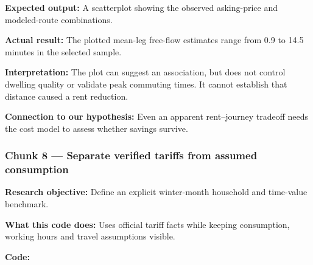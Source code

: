 \documentclass[
]{article}
\newenvironment{Shaded}{\begin{snugshade}}{\end{snugshade}}
\newcommand{\AttributeTok}[1]{\textcolor[rgb]{0.13,0.29,0.53}{#1}}
\newcommand{\DecValTok}[1]{\textcolor[rgb]{0.00,0.00,0.81}{#1}}
\newcommand{\FloatTok}[1]{\textcolor[rgb]{0.00,0.00,0.81}{#1}}
\newcommand{\FunctionTok}[1]{\textcolor[rgb]{0.13,0.29,0.53}{\textbf{#1}}}
\newcommand{\NormalTok}[1]{#1}
\newcommand{\OtherTok}[1]{\textcolor[rgb]{0.56,0.35,0.01}{#1}}
\newcommand{\SpecialCharTok}[1]{\textcolor[rgb]{0.81,0.36,0.00}{\textbf{#1}}}
\newcommand{\StringTok}[1]{\textcolor[rgb]{0.31,0.60,0.02}{#1}}
\begin{document}
\begin{Shaded}
\end{Shaded}

\textbf{Expected output:} A scatterplot showing the observed
asking-price and modeled-route combinations.

\textbf{Actual result:} The plotted mean-leg free-flow estimates range
from 0.9 to 14.5 minutes in the selected sample.

\textbf{Interpretation:} The plot can suggest an association, but does
not control dwelling quality or validate peak commuting times. It cannot
establish that distance caused a rent reduction.

\textbf{Connection to our hypothesis:} Even an apparent rent--journey
tradeoff needs the cost model to assess whether savings survive.

\subsubsection{Chunk 8 --- Separate verified tariffs from assumed
consumption}\label{chunk-8-separate-verified-tariffs-from-assumed-consumption}

\textbf{Research objective:} Define an explicit winter-month household
and time-value benchmark.

\textbf{What this code does:} Uses official tariff facts while keeping
consumption, working hours and travel assumptions visible.

\textbf{Code:}
\end{document}

